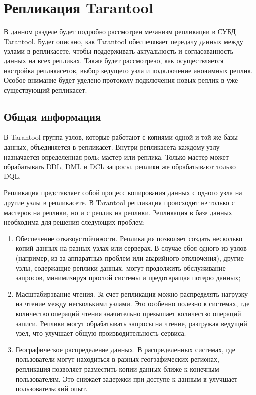 \section{Репликация Tarantool}

В данном разделе будет подробно рассмотрен механизм репликации в СУБД Tarantool. Будет описано, как Tarantool обеспечивает передачу данных между узлами в репликасете, чтобы поддерживать актуальность и согласованность данных на всех репликах. Также будет рассмотрено, как осуществляется настройка репликасетов, выбор ведущего узла и подключение анонимных реплик. Особое внимание будет уделено протоколу подключения новых реплик в уже существующий репликасет.


\subsection{Общая информация}

В Tarantool группа узлов, которые работают с копиями одной и той же базы данных, объединяется в репликасет. Внутри репликасета каждому узлу назначается определенная роль: мастер или реплика. Только мастер может обрабатывать DDL, DML и DCL запросы, реплики же обрабатывают только DQL.

Репликация представляет собой процесс копирования данных с одного узла на другие узлы в репликасете. В Tarantool репликация происходит не только с мастеров на реплики, но и с реплик на реплики. Репликация в базе данных необходима для решения следующих проблем:

\begin{enumerate}
    \item Обеспечение отказоустойчивости. Репликация позволяет создать несколько копий данных на разных узлах или серверах. В случае сбоя одного из узлов (например, из-за аппаратных проблем или аварийного отключения), другие узлы, содержащие реплики данных, могут продолжить обслуживание запросов, минимизируя простой системы и предотвращая потерю данных;
    \item Масштабирование чтения. За счет репликации можно распределять нагрузку на чтение между несколькими узлами. Это особенно полезно в системах, где количество операций чтения значительно превышает количество операций записи. Реплики могут обрабатывать запросы на чтение, разгружая ведущий узел, что улучшает общую производительность сервиса.
    \item Географическое распределение данных. В распределенных системах, где пользователи могут находиться в разных географических регионах, репликация позволяет разместить копии данных ближе к конечным пользователям. Это снижает задержки при доступе к данным и улучшает пользовательский опыт.
\end{enumerate}

